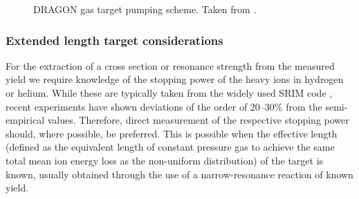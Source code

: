 \begin{figure}
\caption{DRAGON gas target pumping scheme. Taken from \cite{hutc03b}.}
\label{fig:dragon_pumping}
\end{figure}

\subsubsection{Extended length target considerations}
For the extraction of a cross section or resonance strength from the measured yield we require knowledge of the stopping power of the heavy ions in hydrogen or helium. While these are typically taken from the widely used SRIM code \cite{zieg}, recent experiments \cite{grei04} have shown deviations of the order of 20--30\% from the semi-empirical values. Therefore, direct measurement of the respective stopping power should, where possible, be preferred. This is possible when the effective length (defined as the equivalent length of constant pressure gas to achieve the same total mean ion energy loss as the non-uniform distribution) of the target is known, usually obtained through the use of a narrow-resonance reaction of known yield. 

